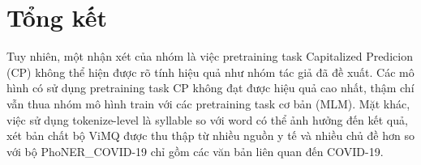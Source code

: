 \section{Tổng kết}
Tuy nhiên, một nhận xét của nhóm là việc pretraining task Capitalized Predicion (CP) không thể hiện được rõ tính hiệu quả như nhóm tác giả đã đề xuất. Các mô hình có sử dụng pretraining task CP không đạt được hiệu quả cao nhất, thậm chí vẫn thua nhóm mô hình train với các pretraining task cơ bản (MLM). Mặt khác, việc sử dụng tokenize-level là syllable so với word có thể ảnh hưởng đến kết quả, xét bản chất bộ ViMQ được thu thập từ nhiều nguồn y tế và nhiều chủ đề hơn so với bộ PhoNER\_COVID-19 chỉ gồm các văn bản liên quan đến COVID-19.